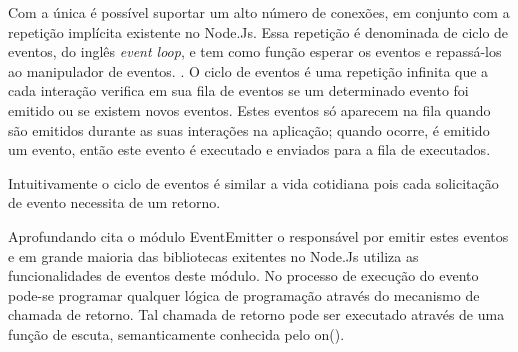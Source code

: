   Com a  única é possível suportar um alto número de conexões, em conjunto com a repetição implícita existente no Node.Js. 
  Essa repetição é denominada de ciclo de eventos, do inglês \textit{event loop}, e tem como função esperar os eventos e repassá-los 
  ao manipulador de eventos. \cite{Tilkov:2010}
  . 
  O ciclo de eventos é uma repetição infinita que a cada interação verifica em sua 
  fila de eventos se um determinado evento foi emitido ou se existem novos eventos. Estes eventos só aparecem na 
  fila quando são emitidos durante as suas interações na aplicação; quando ocorre, é emitido um evento, então este evento 
  é executado e enviados para a fila de executados.\cite{Pereira:2013}
  
  
   
  Intuitivamente o ciclo de eventos é similar a vida cotidiana pois cada solicitação de evento necessita de um retorno.
  
  
  Aprofundando  cita o módulo EventEmitter o responsável por emitir estes eventos e em 
  grande maioria das bibliotecas exitentes no Node.Js utiliza as funcionalidades de eventos deste módulo. 
  No processo de execução do evento pode-se programar qualquer lógica de programação através do 
  mecanismo de chamada de retorno. Tal chamada de retorno pode ser executado através de uma função de escuta, 
  semanticamente conhecida pelo on().
  
